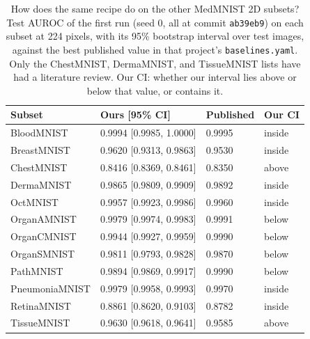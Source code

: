 \begin{table}[t]
\caption{How does the same recipe do on the other MedMNIST 2D subsets? Test AUROC of the first run (seed 0, all at commit \textnormal{\texttt{ab39eb9}}) on each subset at 224 pixels, with its 95\% bootstrap interval over test images, against the best published value in that project's \textnormal{\texttt{baselines.yaml}}. Only the ChestMNIST, DermaMNIST, and TissueMNIST lists have had a literature review. Our CI: whether our interval lies above or below that value, or contains it.}
\label{tab:subsets}
\centering
\footnotesize
\setlength{\tabcolsep}{3pt}
\begin{tabular}{@{}llll@{}}
\toprule
Subset & Ours [95\% CI] & Published & Our CI \\
\midrule
BloodMNIST & 0.9994 [0.9985, 1.0000] & 0.9995 & inside \\
BreastMNIST & 0.9620 [0.9313, 0.9863] & 0.9530 & inside \\
ChestMNIST & 0.8416 [0.8369, 0.8461] & 0.8350 & above \\
DermaMNIST & 0.9865 [0.9809, 0.9909] & 0.9892 & inside \\
OctMNIST & 0.9957 [0.9923, 0.9986] & 0.9960 & inside \\
OrganAMNIST & 0.9979 [0.9974, 0.9983] & 0.9991 & below \\
OrganCMNIST & 0.9944 [0.9927, 0.9959] & 0.9990 & below \\
OrganSMNIST & 0.9811 [0.9793, 0.9828] & 0.9870 & below \\
PathMNIST & 0.9894 [0.9869, 0.9917] & 0.9990 & below \\
PneumoniaMNIST & 0.9979 [0.9958, 0.9993] & 0.9970 & inside \\
RetinaMNIST & 0.8861 [0.8620, 0.9103] & 0.8782 & inside \\
TissueMNIST & 0.9630 [0.9618, 0.9641] & 0.9585 & above \\
\bottomrule
\end{tabular}
\end{table}
